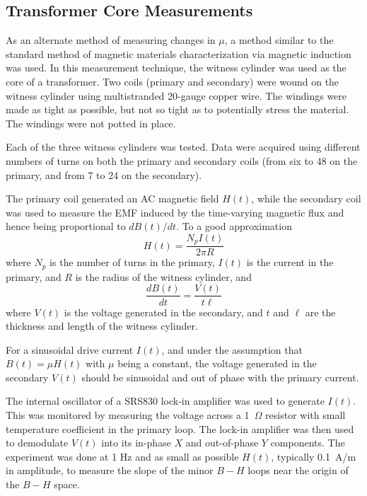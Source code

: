 
\subsection{Transformer Core Measurements}
\label{sec:transformer}

As an alternate method of measuring changes in $\mu$, a method similar
to the standard method of magnetic materials characterization via
magnetic induction was used.  In this measurement technique, the
witness cylinder was used as the core of a transformer.  Two coils
(primary and secondary) were wound on the witness cylinder using
multistranded 20-gauge copper wire.  The windings were made as tight
as possible, but not so tight as to potentially stress the material.
The windings were not potted in place.

Each of the three witness cylinders was tested.  Data were acquired
using different numbers of turns on both the primary and secondary
coils (from six to 48 on the primary, and from 7 to 24 on the
secondary).



The primary coil generated an AC magnetic field $H(t)$, while the
secondary coil was used to measure the EMF induced by the time-varying
magnetic flux and hence being proportional to $dB(t)/dt$.  To a good
approximation
\begin{equation}
H(t)=\frac{N_pI(t)}{2\pi R}
\end{equation}
where $N_p$ is the number of turns in the primary, $I(t)$ is the
current in the primary, and $R$ is the radius of the witness cylinder,
and
\begin{equation}
\frac{dB(t)}{dt}=\frac{V(t)}{t\ell}
\end{equation}
where $V(t)$ is the voltage generated in the secondary, and $t$ and
$\ell$ are the thickness and length of the witness cylinder.

For a sinusoidal drive current $I(t)$, and under the assumption that
$B(t)=\mu H(t)$ with $\mu$ being a constant, the voltage generated in
the secondary $V(t)$ should be sinusoidal and out of phase with the
primary current.

The internal oscillator of a SRS830 lock-in amplifier was used to
generate $I(t)$.  This was monitored by measuring the voltage across a
1~$\Omega$ resistor with small temperature coefficient in the primary
loop.  The lock-in amplifier was then used to demodulate $V(t)$ into
its in-phase $X$ and out-of-phase $Y$ components.  The experiment was
done at 1 Hz and as small as possible $H(t)$, typically 0.1~A/m in
amplitude, to measure the slope of the minor $B-H$ loops near the
origin of the $B-H$ space.

